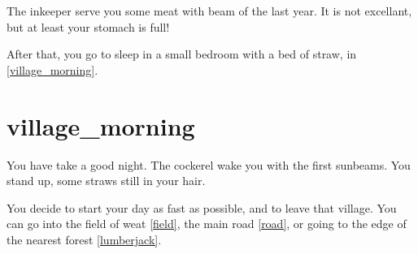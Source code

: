 The inkeeper serve you some meat with beam of the last year. It is not
excellant, but at least your stomach is full!

After that, you go to sleep in a small bedroom with a bed of straw, in
\ref{village_morning}.

\section{village_morning}

You have take a good night. The cockerel wake you with the first sunbeams. You
stand up, some straws still in your hair.

You decide to start your day as fast as possible, and to leave that village.
You can go into the field of weat \ref{field}, the main road \ref{road}, or
going to the edge of the nearest forest \ref{lumberjack}. %

